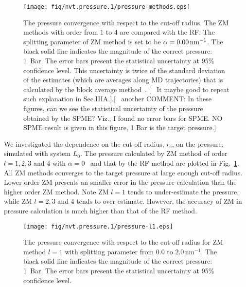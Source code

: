 \documentclass[a4paper,preprint,unsortedaddress,onecolumn,fleqn]{revtex4}
\newcommand{\recheck}[1]{{\color{red} #1}}
\begin{document}
\begin{figure}[tbp]
\centering
\texttt{[image: fig/nvt.pressure.1/pressure-methods.eps]}
\caption{The pressure convergence with respect to the cut-off radius. The ZM
methods with order from 1 to 4 are compared with the RF. The splitting
parameter of ZM method is set to be $\protect\alpha =0.00\,\text{nm}^{-1}$.
The black solid line indicates the magnitude of the correct pressure: 1~Bar.
The error bars present the statistical uncertainty at 95\% confidence level. 
{\color{red} This uncertainty is twice of the standard deviation of the
estimates (which are averages along MD trajectories) that is calculated by
the block average method~\protect\cite{janke2002statistical}.} [ {\ 
\color{blue}It maybe good to repeat such explanation in Sec.IIIA.}].[{\ 
\color{blue} another COMMENT: In these figures, can we see the statistical
uncertainty of the pressure obtained by the SPME? Viz., I found no error
bars for SPME.} \recheck{NO SPME result is given in this figure, 1 Bar is the target pressure.}]}
\label{fig:pres-comp}
\end{figure}

We investigated the dependence on the cut-off radius, $r_{\text{c}}$, on the
pressure, simulated with system $L_{0}$. The pressure calculated by ZM
method of order $l=1,2,3$ and $4$ with $\alpha =0$ \ and that by the RF
method are plotted in Fig.~\ref{fig:pres-comp}. All ZM methods converges to
the target pressure at large enough cut-off radius. Lower order ZM presents
an smaller error in the pressure calculation than the higher order ZM
method. Note ZM $l=1$ tends to under-estimate the pressure, while ZM $l=2,3$
and 4 tends to over-estimate. However, the accuracy of ZM in pressure
calculation is much higher than that of the RF method.

\begin{figure}[tbp]
\centering
\texttt{[image: fig/nvt.pressure.1/pressure-l1.eps]} %
\caption{ The pressure convergence with respect to the cut-off radius for ZM
method $l=1$ with splitting parameter from $0.0$ to $2.0\,\text{nm}^{-1}$.
The black solid line indicates the magnitude of the correct pressure: 1~Bar.
The error bars present the statistical uncertainty at 95\% confidence level.}
\label{fig:pres-l1}
\end{figure}
\end{document}
